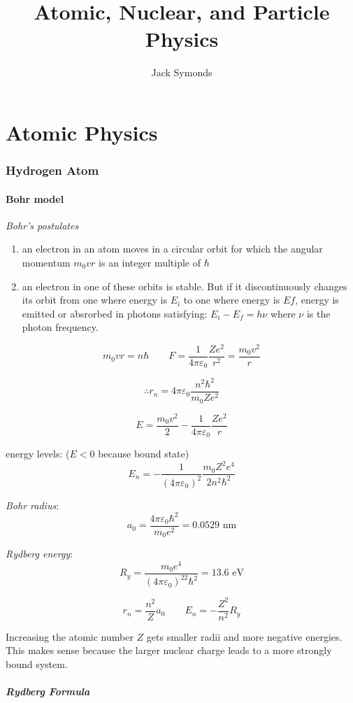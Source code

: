 \documentclass[10pt, a4paper, twocolumn]{article}
\author{Jack Symonds}
\title{Atomic, Nuclear, and Particle Physics}
\date{}
\newcommand{\deff}[1]{\par \noindent \textit{#1}: }
\newcommand{\pfs}{\ensuremath{\varepsilon _0}}
\begin{document}
\maketitle

\part{Atomic Physics}
\section{Hydrogen Atom}
\subsection{Bohr model}

\emph{Bohr's postulates}
\begin{enumerate}
\item an electron in an atom moves in a circular orbit for which the angular momentum $m _0 v r $ is an integer multiple of $\hbar$
\item an electron in one of these orbits is stable. But if it discontinuously changes its orbit from one where energy is $E_i$ to one where energy is $Ef$, energy is emitted or absrorbed in photons satisfying: $E_i - E_f = h\nu$ where $\nu$ is the photon frequency.
\end{enumerate}

\[ m_0 v r = n \hbar
\qquad F = \frac{1}{4 \pi \pfs} \frac{Ze^2}{r^2}
= \frac{m_0 v ^2}{r} \]

\[\therefore r_n = 4 \pi \pfs
\frac{n^2 \hbar ^2}{m_0 Z e^2} \]

\[ E = \frac{m_0v^2}{2} - \frac{1}{4 \pi \pfs}
\frac{Ze^2}{r} \]

energy levels: ($E<0$ because bound state)
\[ E_n = -\frac{1}{(4 \pi \pfs)^2}
\frac{m_0 Z^2 e^4}{2 n^2 \hbar ^2} \]

\deff{Bohr radius}
\[ a_0 = \frac{4 \pi \pfs \hbar ^2}{m _0 e^2}
= 0.0529 \text{ nm} \]

\deff{Rydberg energy}
\[ R_y = \frac{m_0e^4}{(4 \pi \pfs)^22\hbar ^2}
= 13.6 \text{ eV} \]

\[ r_n = \frac{n^2}{Z} a_0 \qquad E_n
= -\frac{Z^2}{n^2} R_y \]

Increasing the atomic number $Z$ gets smaller radii and more negative energies. This makes sense because the larger nuclear charge leads to a more strongly bound system.

\subsubsection{Rydberg Formula}
\end{document}
